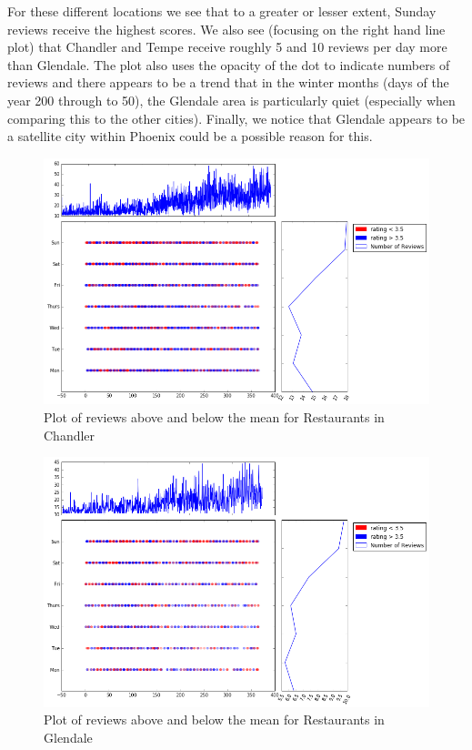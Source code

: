 \documentclass[11pt]{article}
\begin{document}
For these different locations we see that to a greater or lesser extent, Sunday reviews receive the highest scores. We also see (focusing on the right hand line plot) that Chandler and Tempe receive roughly 5 and 10 reviews per day more than Glendale. The plot also uses the opacity of the dot to indicate numbers of reviews and there appears to be a trend that in the winter months (days of the year 200 through to 50), the Glendale area is particularly quiet (especially when comparing this to the other cities). Finally, we notice that Glendale appears to be a satellite city within Phoenix could be a possible reason for this.
\begin{figure}[H]
\centering
\includegraphics[keepaspectratio=true,scale=0.4]{./images/chandler_restaurants}
\caption{Plot of reviews above and below the mean for Restaurants in Chandler}\label{fg:chandler}
\end{figure}

\begin{figure}[H]
\centering
\includegraphics[keepaspectratio=true,scale=0.4]{./images/glendale_restaurants}
\caption{Plot of reviews above and below the mean for Restaurants in Glendale}\label{fg:glendale}
\end{figure}
\end{document}
